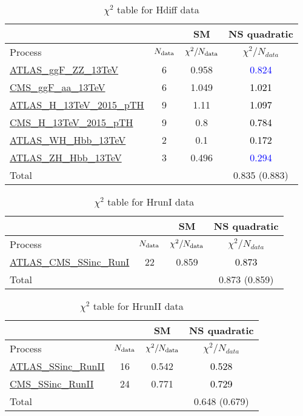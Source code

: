 \documentclass{article}
\begin{document}
\begin{table}[H]
\centering
\begin{tabular}{|l|c|c|c|}
\hline
 \multicolumn{2}{|c|}{} & SM& NS quadratic\\ \hline
Process & $N_{\rm data}$ & $\chi^ 2/N_{\rm data}$& $\chi^ 2/N_{data}$\\ \hline
\href{https://arxiv.org/abs/1909.02845}{ATLAS_ggF_ZZ_13TeV} & 6 & 0.958 & \textcolor{blue}{0.824} \\ \hline
\href{https://inspirehep.net/literature/1725274}{CMS_ggF_aa_13TeV} & 6 & 1.049 & \textcolor{black}{1.021} \\ \hline
\href{https://inspirehep.net/literature/1743896}{ATLAS_H_13TeV_2015_pTH} & 9 & 1.11 & \textcolor{black}{1.097} \\ \hline
\href{https://arxiv.org/abs/1812.06504}{CMS_H_13TeV_2015_pTH} & 9 & 0.8 & \textcolor{black}{0.784} \\ \hline
\href{https://arxiv.org/abs/1903.04618}{ATLAS_WH_Hbb_13TeV} & 2 & 0.1 & \textcolor{black}{0.172} \\ \hline
\href{https://arxiv.org/abs/1903.04618}{ATLAS_ZH_Hbb_13TeV} & 3 & 0.496 & \textcolor{blue}{0.294} \\ \hline
\hline Total & &  & 0.835 (0.883) \\ \hline
\end{tabular}
\caption{$\chi^2$ table for Hdiff data}
\end{table}
\begin{table}[H]
\centering
\begin{tabular}{|l|c|c|c|}
\hline
 \multicolumn{2}{|c|}{} & SM& NS quadratic\\ \hline
Process & $N_{\rm data}$ & $\chi^ 2/N_{\rm data}$& $\chi^ 2/N_{data}$\\ \hline
\href{https://arxiv.org/abs/1606.02266}{ATLAS_CMS_SSinc_RunI} & 22 & 0.859 & \textcolor{black}{0.873} \\ \hline
\hline Total & &  & 0.873 (0.859) \\ \hline
\end{tabular}
\caption{$\chi^2$ table for HrunI data}
\end{table}
\begin{table}[H]
\centering
\begin{tabular}{|l|c|c|c|}
\hline
 \multicolumn{2}{|c|}{} & SM& NS quadratic\\ \hline
Process & $N_{\rm data}$ & $\chi^ 2/N_{\rm data}$& $\chi^ 2/N_{data}$\\ \hline
\href{https://arxiv.org/abs/1909.02845}{ATLAS_SSinc_RunII} & 16 & 0.542 & \textcolor{black}{0.528} \\ \hline
\href{https://arxiv.org/abs/1809.10733}{CMS_SSinc_RunII} & 24 & 0.771 & \textcolor{black}{0.729} \\ \hline
\hline Total & &  & 0.648 (0.679) \\ \hline
\end{tabular}
\caption{$\chi^2$ table for HrunII data}
\end{table}
\end{document}
